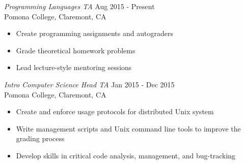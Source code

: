 {\sl Programming Languages TA} \hfill Aug 2015 - Present \\
Pomona College, Claremont, CA
\begin{itemize} \itemsep -2pt
  \item Create programming assignments and autograders
  \item Grade theoretical homework problems
  \item Lead lecture-style mentoring sessions
\end{itemize}

{\sl Intro Computer Science Head TA} \hfill Jan 2015 - Dec 2015 \\
Pomona College, Claremont, CA
\begin{itemize} \itemsep -2pt %
\item Create and enforce usage protocols for distributed Unix system
\item Write management scripts and Unix command line tools to improve the grading process
\item Develop skills in critical code analysis, management, and bug-tracking
\end{itemize}
